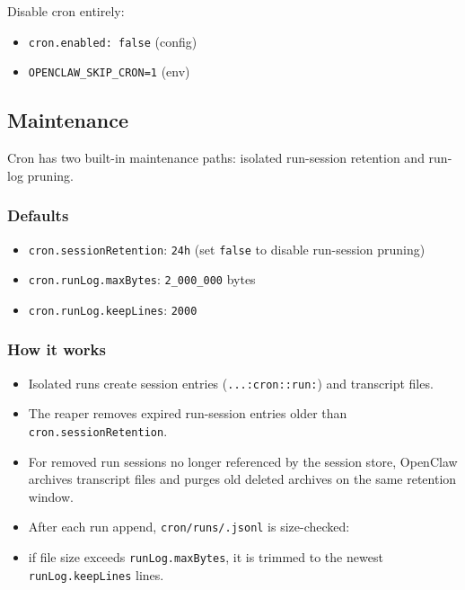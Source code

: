Disable cron entirely:

\begin{itemize}
  \item \texttt{cron.enabled: false} (config)
  \item \texttt{OPENCLAW\_SKIP\_CRON=1} (env)
\end{itemize}


\subsection{Maintenance}


Cron has two built-in maintenance paths: isolated run-session retention and run-log pruning.

\subsubsection{Defaults}


\begin{itemize}
  \item \texttt{cron.sessionRetention}: \texttt{24h} (set \texttt{false} to disable run-session pruning)
  \item \texttt{cron.runLog.maxBytes}: \texttt{2\_000\_000} bytes
  \item \texttt{cron.runLog.keepLines}: \texttt{2000}
\end{itemize}


\subsubsection{How it works}


\begin{itemize}
  \item Isolated runs create session entries (\texttt{...:cron::run:}) and transcript files.
  \item The reaper removes expired run-session entries older than \texttt{cron.sessionRetention}.
  \item For removed run sessions no longer referenced by the session store, OpenClaw archives transcript files and purges old deleted archives on the same retention window.
  \item After each run append, \texttt{cron/runs/.jsonl} is size-checked:
  \item if file size exceeds \texttt{runLog.maxBytes}, it is trimmed to the newest \texttt{runLog.keepLines} lines.
\end{itemize}


